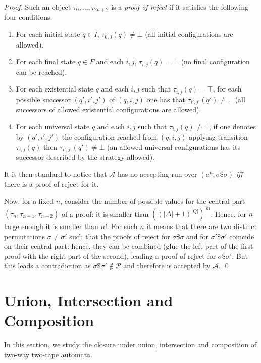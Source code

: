 \documentclass[runningheads, envcountsame, a4paper]{llncs}
\newcommand*{\perm}{\mathcal{P}}
\newcommand*{\separator}{\$}
\newcommand*{\ssi}{\emph{iff}\xspace}
\newcommand*{\atm}{\mathcal{A}}
\renewcommand*{\models}{two-way two-tape automata\xspace}
\begin{document}
\begin{proof}
  Such an object $\tau_0,\dots,\tau_{2n+2}$ is a \emph{proof of reject} if
  it satisfies the following four conditions.
  \begin{enumerate}
  \item For each initial state $q\in I$, $\tau_{0,0}(q)\neq \bot$ (all
    initial configurations are allowed).
  \item For each final state $q\in F$ and each $i,j$, $\tau_{i,j}(q)=\bot$ (no final
    configuration can be reached).
  \item For each existential state $q$ and each $i,j$ such that
    $\tau_{i,j}(q)=\top$, for each possible successor $(q',i',j')$ of
    $(q,i,j)$ one has that $\tau_{i',j'}(q')\neq\bot$ (all successors of
    allowed existential configurations are allowed).
  \item For each universal state $q$ and each $i,j$ such that
    $\tau_{i,j}(q)\neq\bot$, if one denotes by $(q',i',j')$ the
    configuration reached from $(q,i,j)$ applying transition
    $\tau_{i,j}(q)$ then $\tau_{i',j'}(q')\neq\bot$ (an allowed universal
    configurations has its successor described by the strategy allowed).
  \end{enumerate}
  
  It is then standard to notice that $\atm$ has no accepting run over
  $(a^n,\sigma \separator\sigma)$ \ssi there is a proof of reject for it.
  
  Now, for a fixed $n$, consider the number of possible values for the
  central part $(\tau_n,\tau_{n+1},\tau_{n+2})$ of a proof: it is smaller
  than $((|\Delta|+1)^{|Q|})^{3n}$. Hence, for $n$ large enough it is
  smaller than $n!$. For such $n$ it means that there are two distinct
  permutations $\sigma\neq \sigma'$ such that the proofs of reject for
  $\sigma \separator\sigma$ and for $\sigma' \separator\sigma'$ coincide on
  their central part: hence, they can be combined (glue the left part of
  the first proof with the right part of the second), leading a proof of
  reject for $\sigma \separator \sigma'$. But this leads a contradiction as
  $\sigma \separator\sigma'\notin \perm$ and therefore is accepted by
  $\atm$.
\qed\end{proof}


\section{Union, Intersection and Composition}

In this section, we study the closure under union, intersection and
composition of \models.
\end{document}
